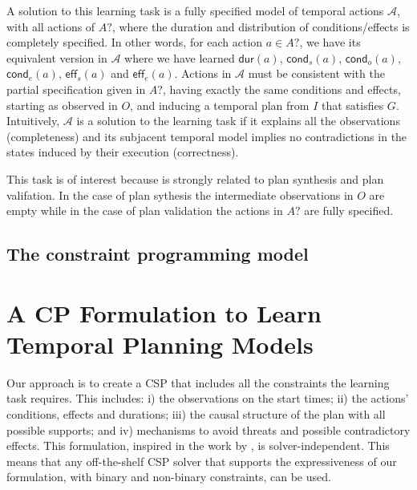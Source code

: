 \documentclass{ecai}
\newcommand{\eff}{\mathsf{eff}}    %
\newcommand{\cond}{\mathsf{cond}}  %
\newcommand{\dur}{\mathsf{dur}}    %
\begin{document}
A solution to this learning task is a fully specified model of temporal actions $\mathcal{A}$, with all actions of $A?$, where the duration and distribution of conditions/effects is completely specified. In other words, for each action $a \in A?$, we have its equivalent version in $\mathcal{A}$ where we have learned $\dur(a)$, $\cond_s(a)$, $\cond_o(a)$, $\cond_e(a)$, $\eff_s(a)$ and $\eff_e(a)$.
Actions in $\mathcal{A}$ must be consistent with the partial specification given in $A?$, having exactly the same conditions and effects, starting as observed in $O$, and inducing a temporal plan from $I$ that satisfies $G$. Intuitively, $\mathcal{A}$ is a solution to the learning task if it explains all the observations (completeness) and its subjacent temporal model implies no contradictions in the states induced by their execution (correctness).

This task is of interest because is strongly related to plan synthesis and plan valifation. In the case of plan sythesis the intermediate observations in $O$ are empty while in the case of plan validation the actions in $A?$ are fully specified.


\subsection{The constraint programming model}

\section{A CP Formulation to Learn Temporal Planning Models}
\label{sec:CPformulation}

Our approach is to create a CSP that includes all the constraints the learning task requires. This includes: i) the observations on the start times; ii) the actions' conditions, effects and durations; iii) the causal structure of the plan with all possible supports; and iv) mechanisms to avoid threats and possible contradictory effects. This formulation, inspired in the work by \cite{garrido2009constraint}, is solver-independent. This means that any off-the-shelf CSP solver that supports the expressiveness of our formulation, with binary and non-binary constraints, can be used.
\end{document}

